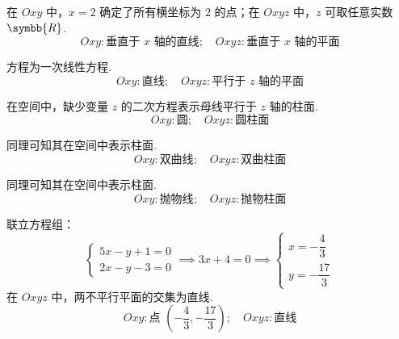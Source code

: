 \begin{solution}

    在 $Oxy$ 中，$x=2$ 确定了所有横坐标为 $2$ 的点；在 $Oxyz$ 中，$z$ 可取任意实数 $\symbb{R}$.
    \begin{equation}
        \boxed{Oxy: \text{垂直于 } x \text{ 轴的直线}; \quad Oxyz: \text{垂直于 } x \text{ 轴的平面}}
    \end{equation}


    方程为一次线性方程.
    \begin{equation}
        \boxed{Oxy: \text{直线}; \quad Oxyz: \text{平行于 } z \text{ 轴的平面}}
    \end{equation}


    在空间中，缺少变量 $z$ 的二次方程表示母线平行于 $z$ 轴的柱面.
    \begin{equation}
        \boxed{Oxy: \text{圆}; \quad Oxyz: \text{圆柱面}}
    \end{equation}


    同理可知其在空间中表示柱面.
    \begin{equation}
        \boxed{Oxy: \text{双曲线}; \quad Oxyz: \text{双曲柱面}}
    \end{equation}


    同理可知其在空间中表示柱面.
    \begin{equation}
        \boxed{Oxy: \text{抛物线}; \quad Oxyz: \text{抛物柱面}}
    \end{equation}


    联立方程组：
    \begin{equation}
        \begin{cases} 5x - y + 1 = 0 \\ 2x - y - 3 = 0 \end{cases} \implies 3x + 4 = 0 \implies \begin{cases} x = -\dfrac{4}{3} \\ y = -\dfrac{17}{3} \end{cases}
    \end{equation}
    在 $Oxyz$ 中，两不平行平面的交集为直线.
    \begin{equation}
        \boxed{Oxy: \text{点 } \left( -\dfrac{4}{3}, -\dfrac{17}{3} \right); \quad Oxyz: \text{直线}}
    \end{equation}


\end{solution}
